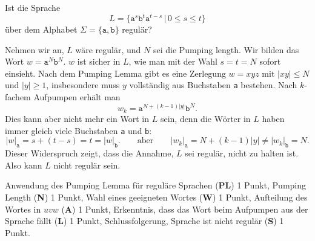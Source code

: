 Ist die Sprache
\[
L=\{
\texttt{a}^s
\texttt{b}^t
\texttt{a}^{t-s}
\,|\, 0\le s\le t
\}
\]
über dem Alphabet $\Sigma=\{\texttt{a},\texttt{b}\}$ regulär?

\begin{loesung}
Nehmen wir an, $L$ wäre regulär, und $N$ sei die Pumping length. 
Wir bilden das Wort $w=\texttt{a}^N\texttt{b}^N$. $w$ ist sicher in $L$,
wie man mit der Wahl $s=t=N$ sofort einsieht. 
Nach dem Pumping Lemma gibt es eine Zerlegung $w=xyz$ mit $|xy|\le N$
und $|y|\ge 1$,
insbesondere muss $y$ vollständig aus Buchstaben \texttt{a} bestehen.
Nach $k$-fachem Aufpumpen erhält man
\[
w_k=\texttt{a}^{N+(k-1)|y|}\texttt{b}^N.
\]
Dies kann aber nicht mehr ein Wort in $L$ sein, denn die Wörter in $L$
haben immer gleich viele Buchstaben \texttt{a} und \texttt{b}:
\[
|w|_{\texttt{a}}
=s+(t-s)=t=
|w|_{\texttt{b}}.
\qquad\text{aber}\qquad
|w_k|_{\texttt{a}}
=N+(k-1)|y|\ne
|w_k|_{\texttt{b}}=N.
\]
Dieser Widerspruch zeigt, dass die Annahme, $L$ sei regulär, nicht zu
halten ist. Also kann $L$ nicht regulär sein.
\end{loesung}

\begin{bewertung}
Anwendung des Pumping Lemma für reguläre Sprachen ({\bf PL}) 1 Punkt,
Pumping Length ({\bf N}) 1 Punkt,
Wahl eines geeigneten Wortes ({\bf W}) 1 Punkt,
Aufteilung des Wortes in $uvw$ ({\bf A}) 1 Punkt,
Erkenntnis, dass das Wort beim Aufpumpen aus der Sprache fällt ({\bf L})
1 Punkt,
Schlussfolgerung, Sprache ist nicht regulär ({\bf S}) 1 Punkt.
\end{bewertung}

